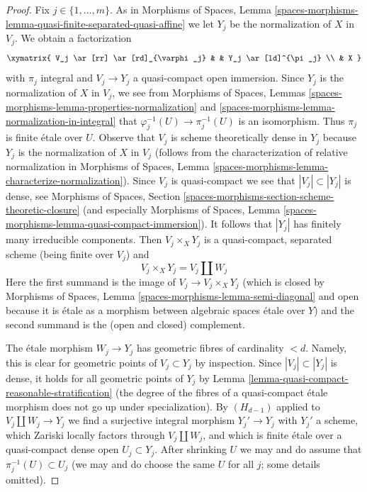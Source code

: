 \documentclass[10pt,a4paper]{amsart}
\theoremstyle{plain}
\theoremstyle{definition}
\theoremstyle{remark}
\numberwithin{equation}{subsection}
\begin{document}
\begin{proof}
\medskip\noindent
Fix $j \in \{1, \ldots, m\}$.
As in Morphisms of Spaces, Lemma
\ref{spaces-morphisms-lemma-quasi-finite-separated-quasi-affine}
we let $Y_j$ be the normalization of $X$ in $V_j$. We obtain a factorization
$$
\xymatrix{
V_j \ar[rr] \ar[rd]_{\varphi_j} & & Y_j \ar[ld]^{\pi_j} \\
& X
}
$$
with $\pi_j$ integral and $V_j \to Y_j$ a quasi-compact open immersion. Since
$Y_j$ is the normalization of $X$ in $V_j$, we see from
Morphisms of Spaces, Lemmas
\ref{spaces-morphisms-lemma-properties-normalization} and
\ref{spaces-morphisms-lemma-normalization-in-integral}
that $\varphi_j^{-1}(U) \to \pi_j^{-1}(U)$ is an isomorphism.
Thus $\pi_j$ is finite \'etale over $U$. Observe that $V_j$
is scheme theoretically dense in $Y_j$ because $Y_j$ is the normalization
of $X$ in $V_j$ (follows from the characterization of relative normalization
in Morphisms of Spaces, Lemma
\ref{spaces-morphisms-lemma-characterize-normalization}). Since $V_j$
is quasi-compact we see that $|V_j| \subset |Y_j|$ is dense,
see Morphisms of Spaces, Section
\ref{spaces-morphisms-section-scheme-theoretic-closure}
(and especially Morphisms of Spaces, Lemma
\ref{spaces-morphisms-lemma-quasi-compact-immersion}).
It follows that $|Y_j|$ has finitely many irreducible components.
Then $V_j \times_X Y_j$ is a quasi-compact, separated scheme
(being finite over $V_j$) and
$$
V_j \times_X Y_j = V_j \amalg W_j
$$
Here the first summand is the image of $V_j \to V_j \times_X Y_j$
(which is closed by
Morphisms of Spaces, Lemma \ref{spaces-morphisms-lemma-semi-diagonal}
and open because it is \'etale as a morphism between
algebraic spaces \'etale over $Y$) and
the second summand is the (open and closed) complement.

\medskip\noindent
The \'etale morphism $W_j \to Y_j$ has geometric fibres of cardinality $< d$.
Namely, this is clear for geometric points of $V_j \subset Y_j$ by inspection.
Since $|V_j| \subset |Y_j|$ is dense, it holds for all geometric points
of $Y_j$ by Lemma \ref{lemma-quasi-compact-reasonable-stratification}
(the degree of the fibres of a quasi-compact \'etale morphism
does not go up under specialization). By $(H_{d - 1})$ applied
to $V_j \amalg W_j \to Y_j$ we find a surjective integral morphism
$Y_j' \to Y_j$ with $Y_j'$ a scheme, which Zariski locally factors
through $V_j \amalg W_j$, and which is finite \'etale over a
quasi-compact dense open $U_j \subset Y_j$. After shrinking $U$
we may and do assume that $\pi_j^{-1}(U) \subset U_j$
(we may and do choose the same $U$ for all $j$; some details omitted).


\end{proof}
\end{document}
